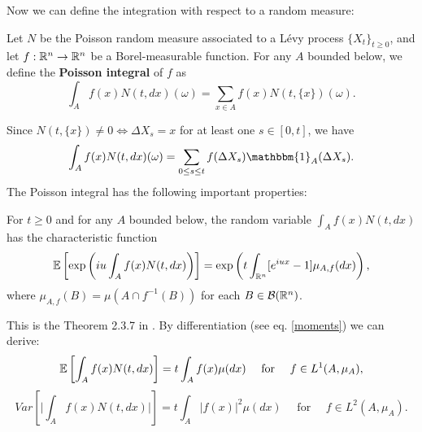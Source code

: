 \noindent
Now we can define the integration with respect to a random measure:
\begin{Definition} \label{Poisson_int}
 Let $N$ be the Poisson random measure associated to a Lévy process $\{X_t\}_{t \geq 0}$, and let $f:\mathbb{R}^n \to \mathbb{R}^n$ be a Borel-measurable
 function. For any $A$ bounded below, we define the \textbf{Poisson integral} of $f$ as
 \begin{equation}
  \int_A f(x) N(t,dx)(\omega) = \sum_{x\in A} f(x) N(t,\{x\})(\omega). 
 \end{equation}
\end{Definition}
Since $N(t,\{x\}) \neq 0 \Leftrightarrow \Delta X_s=x$ for at least one $s\in [0,t]$, we have  
 \begin{equation}
  \int_A f(x) N(t,dx)(\omega) = \sum_{0 \leq s \leq t} f(\Delta X_s) \mathbbm{1}_A(\Delta X_s). 
 \end{equation}
The Poisson integral has the following important properties: 
\begin{Theorem}
 For $t\geq 0$ and for any $A$ bounded below, the random variable $\int_A f(x) N(t,dx)$ has the characteristic function
 \begin{equation}
  \mathbb{E} \left[ \exp \left( i u \int_A f(x) N(t,dx) \right) \right] = 
  \exp \left( t \int_{\mathbb{R}^n} [e^{iux}-1] \mu_{A,f}(dx) \right),
 \end{equation}
where $\mu_{A,f}(B) = \mu(A \cap f^{-1}(B))$ for each $B \in \mathcal{B}(\mathbb{R}^n)$.
\end{Theorem}
This is the Theorem 2.3.7 in \cite{Applebaum}. By differentiation (see eq. \ref{moments}) we can derive:
\begin{equation}\label{Exp_poiss}
 \mathbb{E} \left[ \int_A f(x) N(t,dx) \right] = t \int_A f(x) \mu(dx) \quad \mbox{ for } \quad f \in L^1(A,\mu_A),
\end{equation}
\begin{equation}
 Var \left[ \biggr|\int_A f(x) N(t,dx)\biggr|\right] = t \int_A |f(x)|^2 \mu(dx) \quad \mbox{ for } \quad f \in L^2(A,\mu_A).
\end{equation}


